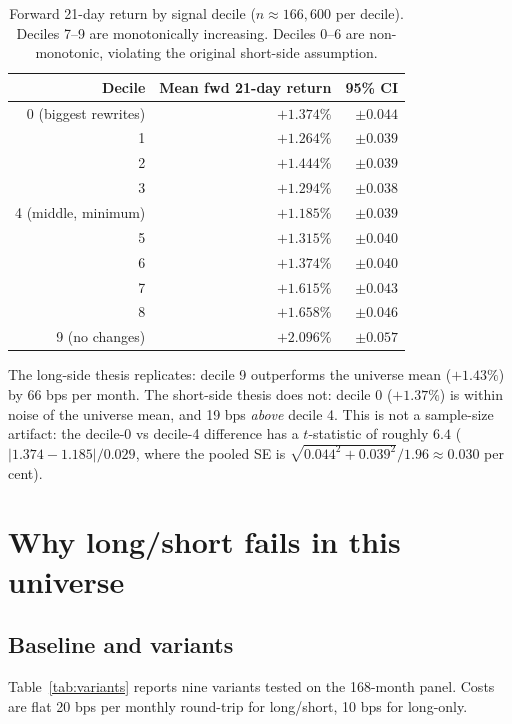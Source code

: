 \documentclass[11pt]{article}
\begin{document}
\begin{table}[h]
\centering
\begin{tabular}{rrr}
\toprule
Decile & Mean fwd 21-day return & 95\% CI \\
\midrule
0 (biggest rewrites) & $+1.374\%$ & $\pm 0.044$ \\
1                    & $+1.264\%$ & $\pm 0.039$ \\
2                    & $+1.444\%$ & $\pm 0.039$ \\
3                    & $+1.294\%$ & $\pm 0.038$ \\
4 (middle, minimum)  & $+1.185\%$ & $\pm 0.039$ \\
5                    & $+1.315\%$ & $\pm 0.040$ \\
6                    & $+1.374\%$ & $\pm 0.040$ \\
7                    & $+1.615\%$ & $\pm 0.043$ \\
8                    & $+1.658\%$ & $\pm 0.046$ \\
9 (no changes)       & $+2.096\%$ & $\pm 0.057$ \\
\bottomrule
\end{tabular}
\caption{Forward 21-day return by signal decile ($n \approx 166{,}600$ per
  decile). Deciles 7--9 are monotonically increasing. Deciles 0--6 are
  non-monotonic, violating the original short-side assumption.}
\end{table}

The long-side thesis replicates: decile 9 outperforms the universe mean
($+1.43\%$) by 66 bps per month. The short-side thesis does not: decile 0
($+1.37\%$) is within noise of the universe mean, and 19 bps \emph{above}
decile 4. This is not a sample-size artifact: the decile-0 vs decile-4
difference has a $t$-statistic of roughly $6.4$ ($|1.374 - 1.185| / 0.029$,
where the pooled SE is $\sqrt{0.044^2 + 0.039^2}/1.96 \approx 0.030$ per
cent).

\section{Why long/short fails in this universe}

\subsection{Baseline and variants}

Table~\ref{tab:variants} reports nine variants tested on the 168-month panel.
Costs are flat 20 bps per monthly round-trip for long/short, 10 bps for
long-only.
\end{document}
